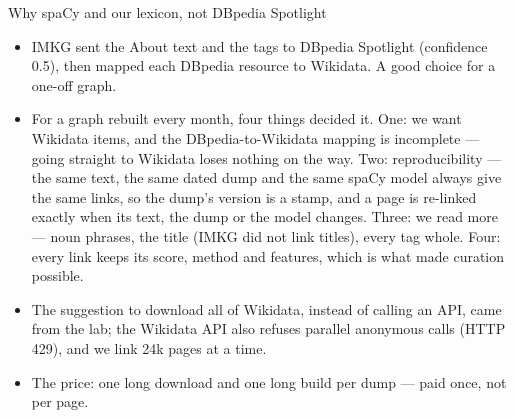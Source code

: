 \begin{frame}{Why spaCy and our lexicon, not DBpedia Spotlight}
{\begin{itemize}
    \item IMKG sent the About text and the tags to DBpedia Spotlight (confidence 0.5), then mapped
      each DBpedia resource to Wikidata. A good choice for a one-off graph.
    \item For a graph rebuilt every month, four things decided it. One: we want Wikidata items,
      and the DBpedia-to-Wikidata mapping is incomplete --- going straight to Wikidata loses
      nothing on the way. Two: reproducibility --- the same text, the same dated dump and the same
      spaCy model always give the same links, so the dump's version is a stamp, and a page is
      re-linked exactly when its text, the dump or the model changes. Three: we read more ---
      noun phrases, the title (IMKG did not link titles), every tag whole. Four: every link keeps
      its score, method and features, which is what made curation possible.
    \item The suggestion to download all of Wikidata, instead of calling an API, came from the
      lab; the Wikidata API also refuses parallel anonymous calls (HTTP 429), and we link 24k
      pages at a time.
    \item The price: one long download and one long build per dump --- paid once, not per page.
  \end{itemize}}
\end{frame}

